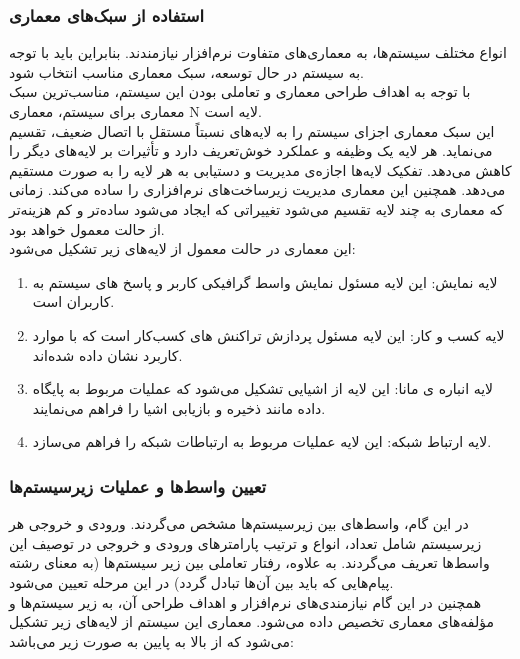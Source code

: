 \documentclass[12pt]{article}
\begin{document}
	\subsubsection{استفاده از سبک‌های معماری}
	انواع مختلف سیستم‌ها، به معماری‌های متفاوت نرم‌افزار نیازمندند. بنابراین باید با توجه به سیستم در حال توسعه، سبک معماری مناسب انتخاب شود.\\
	با توجه به اهداف طراحی معماری و تعاملی بودن این سیستم، مناسب‌ترین سبک معماری برای سیستم، معماری N لایه است.\\
	این سبک معماری اجزای سیستم را به لایه‌های نسبتاً مستقل با اتصال ضعیف، تقسیم می‌نماید. هر لایه یک وظیفه و عملکرد خوش‌تعریف دارد و تأثیرات بر لایه‌های دیگر را کاهش می‌دهد. تفکیک لایه‌ها اجازه‌ی مدیریت و دستیابی به هر لایه را به صورت مستقیم می‌دهد. همچنین این معماری مدیریت زیرساخت‌های نرم‌افزاری را ساده می‌کند. زمانی که معماری به چند لایه تقسیم می‌شود تغییراتی که ایجاد می‌شود ساده‌تر و کم هزینه‌تر از حالت معمول خواهد بود.\\
	این معماری در حالت معمول از لایه‌های زیر تشکیل می‌شود:
	\begin{enumerate}
		\item لایه نمایش:
		این لایه مسئول نمایش واسط گرافیکی کاربر و پاسخ های سیستم به کاربران است.
		\item لایه کسب و کار:
		این لایه مسئول پردازش تراکنش های کسب‌کار است که با موارد کاربرد نشان داده شده‌اند.
		\item لایه انباره ی مانا:
		این لایه از اشیایی تشکیل می‌شود که عملیات مربوط به پایگاه داده مانند ذخیره و بازیابی اشیا را فراهم می‌نمایند.
		\item لایه ارتباط شبکه:
		این لایه عملیات مربوط به ارتباطات شبکه را فراهم می‌سازد.
	\end{enumerate}

	\subsubsection{تعیین واسط‌ها و عملیات زیرسیستم‌ها}
	در این گام، واسط‌های بین زیرسیستم‌ها مشخص می‌گردند. ورودی و خروجی هر زیرسیستم شامل تعداد، انواع و ترتیب پارامترهای ورودی و خروجی در توصیف این واسط‌ها تعریف می‌گردند. به علاوه، رفتار تعاملی بین زیر سیستم‌ها (به معنای رشته پیام‌هایی که باید بین آن‌ها تبادل گردد) در این مرحله تعیین می‌شود.\\
	همچنین در این گام نیازمندی‌های نرم‌افزار و اهداف طراحی آن، به زیر سیستم‌ها و مؤلفه‌های معماری تخصیص داده می‌شود.
	معماری این سیستم از لایه‌های زیر تشکیل می‌شود که از بالا به پایین به صورت زیر می‌باشد:
\end{document}
